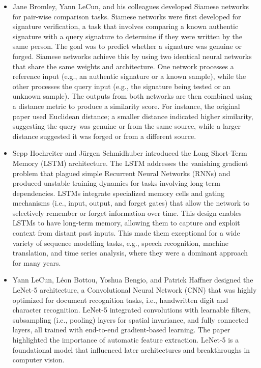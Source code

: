 \begin{itemize}
    \item \textbf{\cite{Bromley1993}}
    Jane Bromley, Yann LeCun, and his colleagues developed Siamese networks for pair-wise comparison tasks. Siamese networks were first developed for signature verification, a task that involves comparing a known authentic signature with a query signature to determine if they were written by the same person. The goal was to predict whether a signature was genuine or forged. Siamese networks achieve this by using two identical neural networks that share the same weights and architecture. One network processes a reference input (e.g., an authentic signature or a known sample), while the other processes the query input (e.g., the signature being tested or an unknown sample). The outputs from both networks are then combined using a distance metric to produce a similarity score. For instance, the original paper used Euclidean distance; a smaller distance indicated higher similarity, suggesting the query was genuine or from the same source, while a larger distance suggested it was forged or from a different source.
    
    \item \textbf{\cite{Hochreiter1997}}
    Sepp Hochreiter and Jürgen Schmidhuber introduced the Long Short-Term Memory (LSTM) architecture. The LSTM addresses the vanishing gradient problem that plagued simple Recurrent Neural Networks (RNNs) and produced unstable training dynamics for tasks involving long-term dependencies. LSTMs integrate specialized memory cells and gating mechanisms (i.e., input, output, and forget gates) that allow the network to selectively remember or forget information over time. This design enables LSTMs to have long-term memory, allowing them to capture and exploit context from distant past inputs. This made them exceptional for a wide variety of sequence modelling tasks, e.g., speech recognition, machine translation, and time series analysis, where they were a dominant approach for many years. 
    
    \item \textbf{\cite{LeCun1998}}
    Yann LeCun, Léon Bottou, Yoshua Bengio, and Patrick Haffner designed the LeNet-5 architecture, a Convolutional Neural Network (CNN) that was highly optimized for document recognition tasks, i.e., handwritten digit and character recognition. LeNet-5 integrated convolutions with learnable filters, subsampling (i.e., pooling) layers for spatial invariance, and fully connected layers, all trained with end-to-end gradient-based learning. The paper highlighted the importance of automatic feature extraction. LeNet-5 is a foundational model that influenced later architectures and breakthroughs in computer vision. 
    

\end{itemize}
